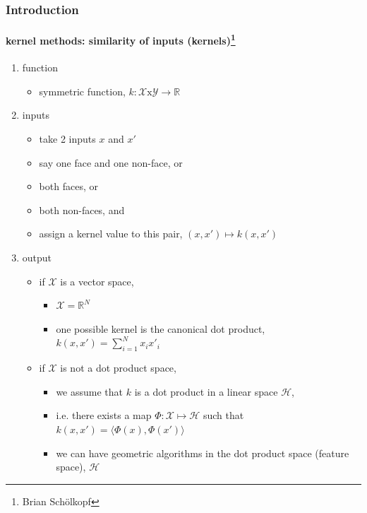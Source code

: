 \begin{frame}
\frametitle{Introduction}
\framesubtitle{kernel methods: similarity of inputs (kernels)\footnote{Brian Sch\"{o}lkopf}}
\logoCSIPCPL\mypagenum
	\begin{enumerate}
		\item {\color{red}function} 
			\begin{itemize}
				\item symmetric function, $k: \mathcal{X}\mbox{x}\mathcal{Y} \rightarrow \mathbb{R}$
				\end{itemize}
		\item {\color{red}inputs} 
			\begin{itemize}
				\item take 2 inputs $x$ and $x'$
				\item say one face and one non-face, or 
				\item both faces, or 
				\item both non-faces, and 
				\item assign a kernel value to this pair, $(x,x') \mapsto k(x,x')$
			\end{itemize}
		\item {\color{red}output}  
			\begin{itemize}
				\item {\color{blue} if $\mathcal{X}$ is a vector space},
					\begin{itemize}
						\item $\mathcal{X} = \mathbb{R}^N$
						\item one possible kernel is the canonical dot product, $k(x,x') = \sum_{i=1}^N x_i x'_i$
					\end{itemize}
				\item {\color{blue} if $\mathcal{X}$ is not a dot product space}, 
					\begin{itemize}
						\item we assume that $k$ is a dot product in a linear space $\mathcal{H}$, 
						\item i.e. there exists a map $\Phi: \mathcal{X} \mapsto \mathcal{H}$ such that $k(x,x') = \langle \Phi(x), \Phi(x') \rangle$
						\item we can have geometric algorithms in the dot product space (feature space), $\mathcal{H}$
					\end{itemize}
			\end{itemize}
	\end{enumerate}
\end{frame}




